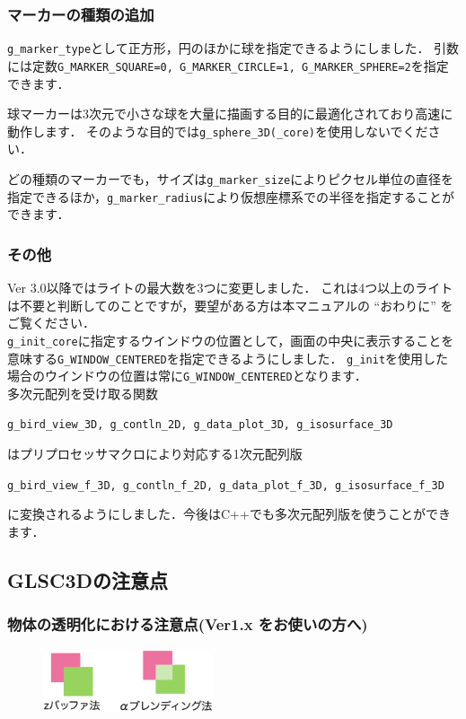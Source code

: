 \documentclass[platex,a4paper,12pt]{jsarticle}%
\begin{document}
\subsubsection{マーカーの種類の追加}
\verb|g_marker_type|として正方形，円のほかに球を指定できるようにしました．
引数には定数\verb|G_MARKER_SQUARE=0, G_MARKER_CIRCLE=1, G_MARKER_SPHERE=2|を指定できます．

球マーカーは3次元で小さな球を大量に描画する目的に最適化されており高速に動作します．
そのような目的では\verb|g_sphere_3D(_core)|を使用しないでください．

どの種類のマーカーでも，サイズは\verb|g_marker_size|によりピクセル単位の直径を指定できるほか，\verb|g_marker_radius|により仮想座標系での半径を指定することができます．

\subsubsection{その他}
Ver 3.0以降ではライトの最大数を3つに変更しました．
これは4つ以上のライトは不要と判断してのことですが，要望がある方は本マニュアルの ``おわりに'' をご覧ください．\\

\verb|g_init_core|に指定するウインドウの位置として，画面の中央に表示することを意味する\verb|G_WINDOW_CENTERED|を指定できるようにしました．
\verb|g_init|を使用した場合のウインドウの位置は常に\verb|G_WINDOW_CENTERED|となります．\\

多次元配列を受け取る関数
\begin{center}
	\verb|g_bird_view_3D, g_contln_2D, g_data_plot_3D, g_isosurface_3D|
\end{center}
はプリプロセッサマクロにより対応する1次元配列版
\begin{center}
	\verb|g_bird_view_f_3D, g_contln_f_2D, g_data_plot_f_3D, g_isosurface_f_3D|
\end{center}
に変換されるようにしました．今後はC++でも多次元配列版を使うことができます．

\newpage
\subsection{GLSC3Dの注意点}

\subsubsection{物体の透明化における注意点(Ver1.x をお使いの方へ)}

\begin{figure}
\vspace{-1\baselineskip}
	\includegraphics[width=50mm]{./Figures/eps/004.eps}
\end{figure}
\end{document}
